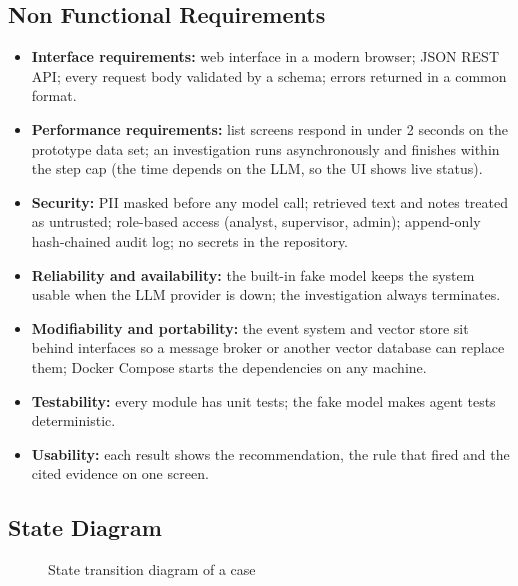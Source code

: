 \documentclass[oneside,a4paper,12pt]{report}
\begin{document}
\subsection{Non Functional Requirements}
\begin{itemize}
  \item \textbf{Interface requirements:} web interface in a modern browser; JSON REST API; every request body validated by a schema; errors returned in a common format.
  \item \textbf{Performance requirements:} list screens respond in under 2 seconds on the prototype data set; an investigation runs asynchronously and finishes within the step cap (the time depends on the LLM, so the UI shows live status).
  \item \textbf{Security:} PII masked before any model call; retrieved text and notes treated as untrusted; role-based access (analyst, supervisor, admin); append-only hash-chained audit log; no secrets in the repository.
  \item \textbf{Reliability and availability:} the built-in fake model keeps the system usable when the LLM provider is down; the investigation always terminates.
  \item \textbf{Modifiability and portability:} the event system and vector store sit behind interfaces so a message broker or another vector database can replace them; Docker Compose starts the dependencies on any machine.
  \item \textbf{Testability:} every module has unit tests; the fake model makes agent tests deterministic.
  \item \textbf{Usability:} each result shows the recommendation, the rule that fired and the cited evidence on one screen.
\end{itemize}

\subsection{State Diagram}
\begin{figure}[H]
\centering
{}
\caption{State transition diagram of a case}
\label{fig:state-dig}
\end{figure}
\end{document}
